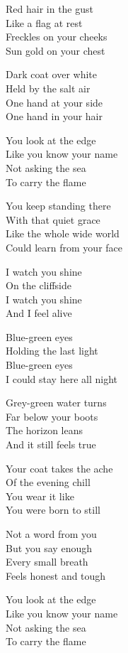 \begin{lyrics}
Red hair in the gust\\
Like a flag at rest\\
Freckles on your cheeks\\
Sun gold on your chest

Dark coat over white\\
Held by the salt air\\
One hand at your side\\
One hand in your hair

You look at the edge\\
Like you know your name\\
Not asking the sea\\
To carry the flame

You keep standing there\\
With that quiet grace\\
Like the whole wide world\\
Could learn from your face

I watch you shine\\
On the cliffside\\
I watch you shine\\
And I feel alive

Blue-green eyes\\
Holding the last light\\
Blue-green eyes\\
I could stay here all night

Grey-green water turns\\
Far below your boots\\
The horizon leans\\
And it still feels true

Your coat takes the ache\\
Of the evening chill\\
You wear it like\\
You were born to still

Not a word from you\\
But you say enough\\
Every small breath\\
Feels honest and tough

You look at the edge\\
Like you know your name\\
Not asking the sea\\
To carry the flame


\end{lyrics}
